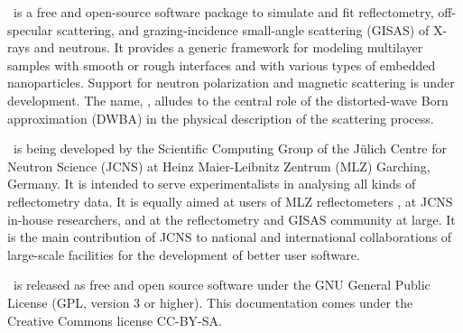 

\cleardoublepage
{}


\BornAgain\ is a free and open-source software package
to simulate and fit
reflectometry, off-specular scattering,
and grazing-incidence small-angle scattering (GISAS)
of X-rays and neutrons.
It provides a generic framework
for modeling multilayer samples with smooth or
rough interfaces and with various types of embedded nanoparticles.
Support for neutron polarization and magnetic scattering
is under development.
The name, \BornAgain,
alludes to the central role of the distorted-wave Born
approximation (DWBA) in the physical description of the
scattering process.

\BornAgain\ is being developed
by the Scientific Computing Group
of the J\"ulich Centre for Neutron Science (JCNS)
at Heinz Maier-Leibnitz Zentrum (MLZ) Garching, Germany.
It is intended to serve experimentalists in analysing all kinds
of reflectometry data.
It is equally aimed at users of MLZ reflectometers
\cite{mlz:maria,mlz:nrex,mlz:refsans},
at JCNS in-house researchers,
and at the reflectometry and GISAS community at large.
It is the main contribution of JCNS to national \cite{ba:hdri}
and international \cite{ba:sine2020} collaborations
of large-scale facilities for the development of better user software.

\BornAgain\ is released as free and open source software under
the GNU General Public License (GPL, version 3 or higher).
This documentation comes under the Creative Commons license CC-BY-SA.


